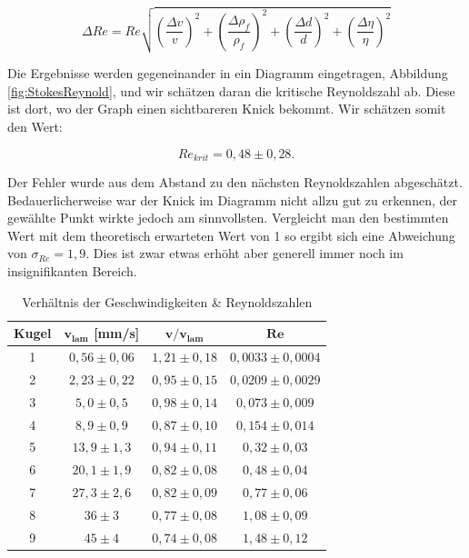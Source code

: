 \documentclass{article}
\begin{document}
\begin{equation}
    \Delta Re = Re \sqrt{\left( \frac{\Delta v}{v} \right)^2 + \left( \frac{\Delta \rho_f}{\rho_f} \right)^2 + \left( \frac{\Delta d}{d} \right)^2 + \left( \frac{\Delta \eta}{\eta} \right)^2}
\end{equation}

Die Ergebnisse werden gegeneinander in ein Diagramm eingetragen, Abbildung \ref{fig:StokesReynold}, und wir schätzen daran die kritische Reynoldszahl ab. Diese ist dort, wo der Graph einen sichtbareren Knick bekommt. Wir schätzen somit den Wert:

\begin{equation}
    Re_{krit} = 0,48 \pm 0,28.
\end{equation}

Der Fehler wurde aus dem Abstand zu den nächsten Reynoldszahlen abgeschätzt. Bedauerlicherweise war der Knick im Diagramm nicht allzu gut zu erkennen, der gewählte Punkt wirkte jedoch am sinnvollsten. Vergleicht man den bestimmten Wert mit dem theoretisch erwarteten Wert von 1 so ergibt sich eine Abweichung von $\sigma_{Re} = 1,9$. Dies ist zwar etwas erhöht aber generell immer noch im insignifikanten Bereich. 

\phantom{.}

\begin{table}[!h]
    \centering
    \begin{tabular}{cccc}
        \hline
        \textbf{Kugel} & $\bm{v_{lam}}$ [mm/s] & $\bm{v/v_{lam}}$ & $\bm{Re}$  \\ \hline
        1 & $0,56 \pm 0,06$ & $1,21 \pm 0,18$ & $0,0033 \pm 0,0004$     \\
        2 & $2,23 \pm 0,22$ & $0,95 \pm 0,15$ & $0,0209 \pm 0,0029$     \\
        3 & $5,0 \pm 0,5$   & $0,98 \pm 0,14$ & $0,073 \pm 0,009$     \\
        4 & $8,9 \pm 0,9$   & $0,87 \pm 0,10$ & $0,154 \pm 0,014$     \\
        5 & $13,9 \pm 1,3$  & $0,94 \pm 0,11$ & $0,32 \pm 0,03$     \\
        6 & $20,1 \pm 1,9$  & $0,82 \pm 0,08$ & $0,48 \pm 0,04$     \\
        7 & $27,3 \pm 2,6$  & $0,82 \pm 0,09$ & $0,77 \pm 0,06$     \\
        8 & $36 \pm 3$      & $0,77 \pm 0,08$ & $1,08 \pm 0,09$     \\
        9 & $45 \pm 4$      & $0,74 \pm 0,08$ & $1,48 \pm 0,12$     \\ \hline
    \end{tabular}%
    \caption{Verhältnis der Geschwindigkeiten \& Reynoldszahlen}
    \label{tab:v_lam&Re}
\end{table}
\end{document}

